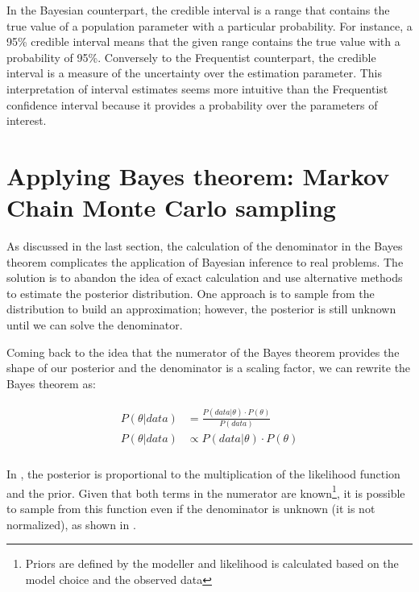 In the Bayesian counterpart, the credible interval is a range that contains the true value of a population parameter with a particular probability. For instance, a 95\% credible interval means that the given range contains the true value with a probability of 95\%. Conversely to the Frequentist counterpart, the credible interval is a measure of the uncertainty over the estimation parameter. This interpretation of interval estimates seems more intuitive than the Frequentist confidence interval because it provides a probability over the parameters of interest. 

\section{Applying Bayes theorem: Markov Chain Monte Carlo sampling }\label{section:MCMC}

As discussed in the last section, the calculation of the denominator in the Bayes theorem complicates the application of Bayesian inference to real problems. The solution is to abandon the idea of exact calculation and use alternative methods to estimate the posterior distribution. One approach is to sample from the distribution to build an approximation; however, the posterior is still unknown until we can solve the denominator. 

Coming back to the idea that the numerator of the Bayes theorem provides the shape of our posterior and the denominator is a scaling factor, we can rewrite the Bayes theorem as: 


\begin{align}\label{eq:bayes_numerator}
\begin{split}
    P(\theta|data)&=\frac{P(data|\theta)\cdot P(\theta)}{P(data)}\\
    P(\theta|data) & \propto P(data|\theta)\cdot P(\theta)\\
\end{split}
\end{align}

In , the posterior is proportional to the multiplication of the likelihood function and the prior. Given that both terms in the numerator are known\footnote{Priors are defined by the modeller and likelihood is calculated based on the model choice and the observed data}, it is possible to sample from this function even if the denominator is unknown (it is not normalized), as shown in . 

